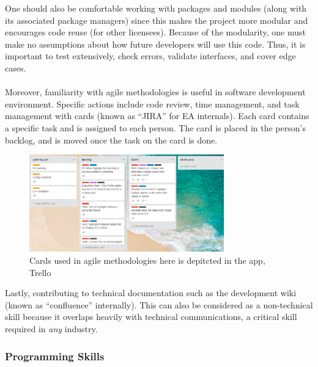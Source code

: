 \documentclass[10pt,letterpaper]{article}
\begin{document}
One should also be comfortable working with packages and modules (along with its associated package managers) since this makes the project more modular and encourages code reuse (for other licensees). Because of the modularity, one must make no assumptions about how future developers will use this code. Thus, it is important to test extensively, check errors, validate interfaces, and cover edge cases.\\
\\
Moreover, familiarity with agile methodologies is useful in software development environment. Specific actions include code review, time management, and task management with cards (known as ``JIRA'' for EA internals). Each card contains a specific task and is assigned to each person. The card is placed in the person's backlog, and is moved once the task on the card is done.\\
\begin{figure}[H]
	\centering
	\includegraphics[width=0.75\textwidth]{assets/cards}
	\caption{Cards used in agile methodologies here is depitcted in the app, Trello}
	\label{fig:trello-cards}
\end{figure}
Lastly, contributing to technical documentation such as the development wiki (known as ``confluence'' internally). This can also be considered as a non-technical skill because it overlaps heavily with technical communications, a critical skill required in \textit{any} industry.\\

\subsubsection{Programming Skills}
\end{document}
